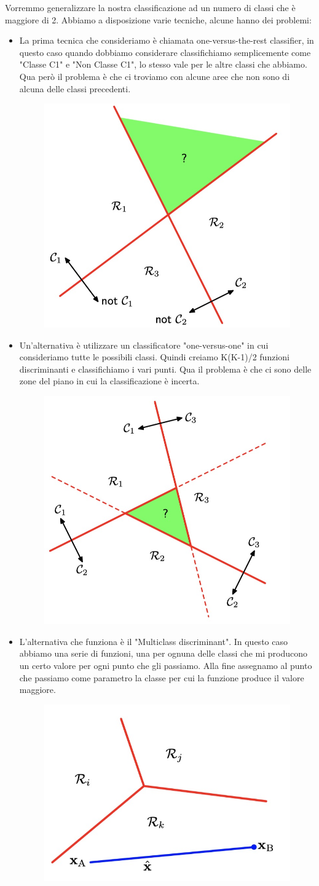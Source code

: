 \documentclass[14pt]{extreport}
\begin{document}
Vorremmo generalizzare la nostra classificazione ad un numero di classi che è maggiore di 2. Abbiamo a disposizione varie tecniche, alcune hanno dei
problemi:

\begin{itemize}
	\item La prima tecnica che consideriamo è chiamata one-versus-the-rest classifier, in questo caso quando dobbiamo considerare classifichiamo
	      semplicemente come "Classe C1" e "Non Classe C1", lo stesso vale per le altre classi che abbiamo. Qua però il problema è che ci troviamo con
	      alcune aree che non sono di alcuna delle classi precedenti.
	      \begin{figure}[H]
		      \centering
		      \includegraphics[width=0.3\linewidth]{148.jpeg}
	      \end{figure}
	\item Un'alternativa è utilizzare un classificatore "one-versus-one" in cui consideriamo tutte le possibili classi. Quindi creiamo K(K-1)/2
	      funzioni discriminanti e classifichiamo i vari punti. Qua il problema è che ci sono delle zone del piano in cui la classificazione è
	      incerta.\begin{figure}[H]
		      \centering
		      \includegraphics[width=0.3\linewidth]{149.jpeg}
	      \end{figure}
	\item L'alternativa che funziona è il "Multiclass discriminant". In questo caso abbiamo una serie di funzioni, una per ognuna delle classi che mi
	      producono un certo valore per ogni punto che gli passiamo. Alla fine assegnamo al punto che passiamo come parametro la classe per cui la
	      funzione produce il valore maggiore.\begin{figure}[H]
		      \centering
		      \includegraphics[width=0.3\linewidth]{150.jpeg}
	      \end{figure}
\end{itemize}
\end{document}
